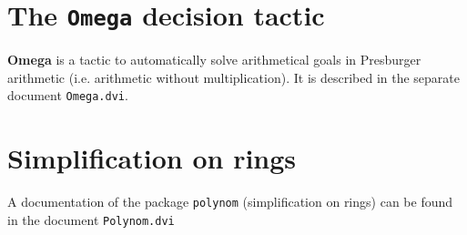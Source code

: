 \section[The {\tt Omega} decision tactic]{The {\tt Omega} decision tactic\label{Addoc-omega}}
{\bf Omega} is a tactic to automatically solve arithmetical goals in
Presburger arithmetic (i.e. arithmetic without multiplication). 
It is described in the separate document {\tt Omega.dvi}.

\section[Simplification on rings]{Simplification on rings\label{Addoc-polynom}}
A documentation of the package {\tt polynom} (simplification on rings)
can be found in the document {\tt Polynom.dvi}





